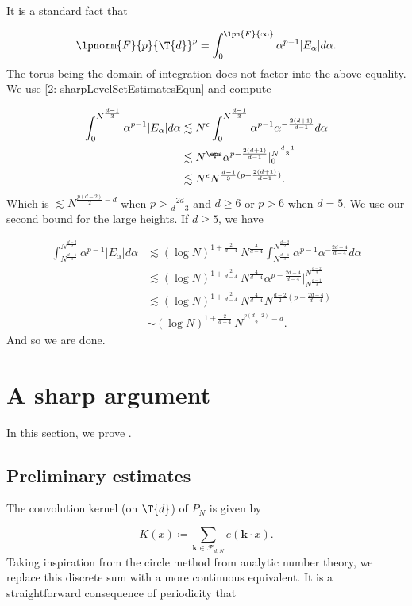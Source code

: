 \documentclass[11pt]{amsart}
\begin{document}
It is a standard fact that

\begin{equation*}
    \lpnorm{F}{p}{\T{d}}^p = \int_0^{\lpn{F}{\infty}}\alpha^{p-1}|E_\alpha|d\alpha.
\end{equation*}
The torus being the domain of integration does not factor into the above equality. We use \eqref{2: sharpLevelSetEstimatesEqun} and compute

\begin{align*}
    \int_0^{N^{\frac{d-1}{3}}}\alpha^{p-1}|E_\alpha|d\alpha&
    \lesssim N^\epsilon\int_0^{N^{\frac{d-1}{3}}}\alpha^{p-1}\alpha^{-\frac{2(d+1)}{d-1}}d\alpha\\
    &\lesssim N^\eps\alpha^{p-\frac{2(d+1)}{d-1}}|_0^{N^{\frac{d-1}{3}}}\\
    &\lesssim N^\epsilon N^{\frac{d-1}{3}(p-\frac{2(d+1)}{d-1})}.
\end{align*}
Which is $\lesssim N^{\frac{p(d-2)}{2}-d}$ when $p>\frac{2d}{d-3}$ and $d\geq 6$ or $p>6$ when $d=5$. We use our second bound for the large heights. If $d\geq 5$, we have

\begin{align*}
    \int_{N^{\frac{d-1}{3}}}^{N^{\frac{d-2}{2}}}\alpha^{p-1}|E_\alpha|d\alpha&
    \lesssim (\log N)^{1+\frac{2}{d-4}}\,N^{\frac{4}{d-4}}\int_{N^{\frac{d-1}{3}}}^{N^{\frac{d-2}{2}}}\alpha^{p-1}\alpha^{-\frac{2d-4}{d-4}}d\alpha\\
    &\lesssim (\log N)^{1+\frac{2}{d-4}}\,N^{\frac{4}{d-4}}\alpha^{p-\frac{2d-4}{d-4}}|_{N^{\frac{d-1}{3}}}^{N^{\frac{d-2}{2}}}\\
    &\lesssim (\log N)^{1+\frac{2}{d-4}}\,N^{\frac{4}{d-4}} N^{\frac{d-2}{2}(p-\frac{2d-4}{d-4})}\\
    &\sim (\log N)^{1+\frac{2}{d-4}}\,N^{\frac{p(d-2)}{2}-d}.
\end{align*}
And so we are done.
\section{A sharp argument}\label{Section3}
\noindent
In this section, we prove .

\subsection{Preliminary estimates}
The convolution kernel (on $\T{d}$) of $P_N$ is given by

\begin{equation}\label{3: kernel1stDefEqn}
    K(x) \coloneq \sum_{\mathbf{k}\in\mathcal{F}_{d,N}}e(\mathbf{k}\cdot x).
\end{equation}
Taking inspiration from the circle method from analytic number theory, we replace this discrete sum with a more continuous equivalent. It is a straightforward consequence of periodicity that
\end{document}
